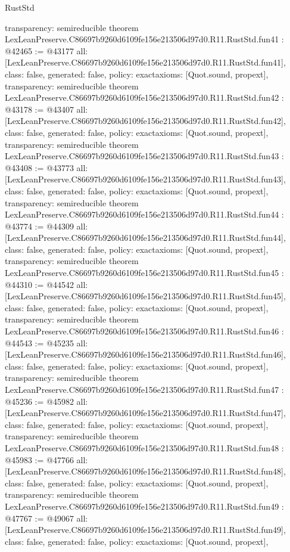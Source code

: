 \begin{lexlean}{RustStd}
\begin{coremodule}
{  transparency: semireducible
}
theorem LexLeanPreserve.C86697b9260d6109fe156e213506d97d0.R11.RustStd.fun41 : @42465 := @43177 {
  all: [LexLeanPreserve.C86697b9260d6109fe156e213506d97d0.R11.RustStd.fun41],
  class: false,
  generated: false,
  policy: exact{axioms: [Quot.sound, propext]},
  transparency: semireducible
}
theorem LexLeanPreserve.C86697b9260d6109fe156e213506d97d0.R11.RustStd.fun42 : @43178 := @43407 {
  all: [LexLeanPreserve.C86697b9260d6109fe156e213506d97d0.R11.RustStd.fun42],
  class: false,
  generated: false,
  policy: exact{axioms: [Quot.sound, propext]},
  transparency: semireducible
}
theorem LexLeanPreserve.C86697b9260d6109fe156e213506d97d0.R11.RustStd.fun43 : @43408 := @43773 {
  all: [LexLeanPreserve.C86697b9260d6109fe156e213506d97d0.R11.RustStd.fun43],
  class: false,
  generated: false,
  policy: exact{axioms: [Quot.sound, propext]},
  transparency: semireducible
}
theorem LexLeanPreserve.C86697b9260d6109fe156e213506d97d0.R11.RustStd.fun44 : @43774 := @44309 {
  all: [LexLeanPreserve.C86697b9260d6109fe156e213506d97d0.R11.RustStd.fun44],
  class: false,
  generated: false,
  policy: exact{axioms: [Quot.sound, propext]},
  transparency: semireducible
}
theorem LexLeanPreserve.C86697b9260d6109fe156e213506d97d0.R11.RustStd.fun45 : @44310 := @44542 {
  all: [LexLeanPreserve.C86697b9260d6109fe156e213506d97d0.R11.RustStd.fun45],
  class: false,
  generated: false,
  policy: exact{axioms: [Quot.sound, propext]},
  transparency: semireducible
}
theorem LexLeanPreserve.C86697b9260d6109fe156e213506d97d0.R11.RustStd.fun46 : @44543 := @45235 {
  all: [LexLeanPreserve.C86697b9260d6109fe156e213506d97d0.R11.RustStd.fun46],
  class: false,
  generated: false,
  policy: exact{axioms: [Quot.sound, propext]},
  transparency: semireducible
}
theorem LexLeanPreserve.C86697b9260d6109fe156e213506d97d0.R11.RustStd.fun47 : @45236 := @45982 {
  all: [LexLeanPreserve.C86697b9260d6109fe156e213506d97d0.R11.RustStd.fun47],
  class: false,
  generated: false,
  policy: exact{axioms: [Quot.sound, propext]},
  transparency: semireducible
}
theorem LexLeanPreserve.C86697b9260d6109fe156e213506d97d0.R11.RustStd.fun48 : @45983 := @47766 {
  all: [LexLeanPreserve.C86697b9260d6109fe156e213506d97d0.R11.RustStd.fun48],
  class: false,
  generated: false,
  policy: exact{axioms: [Quot.sound, propext]},
  transparency: semireducible
}
theorem LexLeanPreserve.C86697b9260d6109fe156e213506d97d0.R11.RustStd.fun49 : @47767 := @49067 {
  all: [LexLeanPreserve.C86697b9260d6109fe156e213506d97d0.R11.RustStd.fun49],
  class: false,
  generated: false,
  policy: exact{axioms: [Quot.sound, propext]},
}
\end{coremodule}
\end{lexlean}
